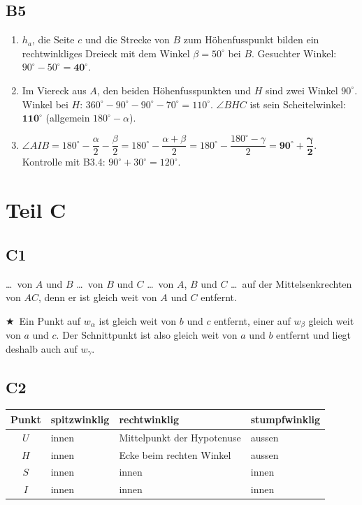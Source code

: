 \documentclass[11pt,a4paper]{article}
\newcommand{\stern}{$\bigstar$\ }
\begin{document}
\subsection{B5}
\begin{enumerate}
\item $h_a$, die Seite $c$ und die Strecke von $B$ zum H\"ohenfusspunkt bilden ein rechtwinkliges Dreieck mit dem Winkel $\beta = 50^\circ$ bei $B$. Gesuchter Winkel: $90^\circ - 50^\circ = \mathbf{40^\circ}$.
\item Im Viereck aus $A$, den beiden H\"ohenfusspunkten und $H$ sind zwei Winkel $90^\circ$. Winkel bei $H$: $360^\circ - 90^\circ - 90^\circ - 70^\circ = 110^\circ$. $\angle BHC$ ist sein Scheitelwinkel: $\mathbf{110^\circ}$ (allgemein $180^\circ - \alpha$).
\item $\angle AIB = 180^\circ - \dfrac{\alpha}{2} - \dfrac{\beta}{2} = 180^\circ - \dfrac{\alpha+\beta}{2} = 180^\circ - \dfrac{180^\circ - \gamma}{2} = \mathbf{90^\circ + \dfrac{\gamma}{2}}$. Kontrolle mit B3.4: $90^\circ + 30^\circ = 120^\circ$.
\end{enumerate}

\section{Teil C}

\subsection{C1}
\ldots\ von $A$ und $B$ \ldots\ von $B$ und $C$ \ldots\ von $A$, $B$ und $C$ \ldots\ auf der Mittelsenkrechten von $AC$, denn er ist gleich weit von $A$ und $C$ entfernt.

\stern Ein Punkt auf $w_\alpha$ ist gleich weit von $b$ und $c$ entfernt, einer auf $w_\beta$ gleich weit von $a$ und $c$. Der Schnittpunkt ist also gleich weit von $a$ und $b$ entfernt und liegt deshalb auch auf $w_\gamma$.

\subsection{C2}
\begin{tabularx}{\linewidth}{|>{\bfseries}c|L|L|L|}
\hline
Punkt & \textbf{spitzwinklig} & \textbf{rechtwinklig} & \textbf{stumpfwinklig} \\ \hline
$U$ & innen & Mittelpunkt der Hypotenuse & aussen \\ \hline
$H$ & innen & Ecke beim rechten Winkel & aussen \\ \hline
$S$ & innen & innen & innen \\ \hline
$I$ & innen & innen & innen \\ \hline
\end{tabularx}
\end{document}

